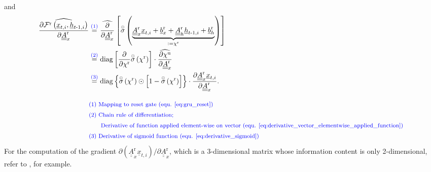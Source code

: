 and
\begin{align} \label{eq:gru_grad_intra_reset_2_Arx} 
    \widehat{
        \frac{\partial \mathcal{F}^\text{r}\left(\underline x_{t, i}, \underline h_{t\text -1, i}\right)}
            {\partial \underline{\underline{A}}^\text{r}_x} 
    }
    &\overset{\textcolor{blue}{(1)}}{=}
    \widehat{
        \frac{\partial}{\partial \underline{\underline{A}}^\text{r}_x} 
    }
    \left[
        \overset{\scriptscriptstyle \odot}{\sigma} \left(
            \underbrace{
            \underline{\underline A}^\text{r}_{x}
            \underline x_{t,i}
            +
            \underline b^\text{r}_{x}
            +
            \underline{\underline A}^\text{r}_{h}
            \underline h_{t\text -1,i}
            +
            \underline b^\text{r}_{h}}_{:=\chi^\text{r}}
        \right)
    \right]
    \nonumber \\ & \overset{\textcolor{blue}{(2)}}{=}
    \mathrm{diag} \left[
        \frac{\partial}{\partial \chi^\text{r}}
        \overset{\scriptscriptstyle \odot}{\sigma} \left(\chi^\text{r}\right)
    \right]
    \cdot
    \widehat{
        \frac{\partial \chi^\text{u}{}}
            {\partial \underline{\underline{A}}^\text{r}_x} 
    }
    \nonumber \\ & \overset{\textcolor{blue}{(3)}}{=}
    \mathrm{diag} \left\{
        \overset{\scriptscriptstyle \odot}{\sigma} \left(\chi^\text{r}\right)
        \odot
        \left[
            1 -  \overset{\scriptscriptstyle \odot}{\sigma} \left(\chi^\text{r}\right)
        \right]
    \right\}
    \cdot
    \frac{\partial \underline{\underline A}^\text{r}_{x}\underline x_{t,i}}
        {\partial \underline{\underline{A}}^\text{r}_x} 
        .
    \\[2ex]
        &\textcolor{blue}{\text{\footnotesize (1) 
            Mapping to reset gate (equ. \ref{eq:gru_reset})}} \nonumber \\
        &\textcolor{blue}{\text{\footnotesize (2) 
            Chain rule of differentiation;
        }} \nonumber \\
        &\textcolor{blue}{\text{\footnotesize \qquad
            Derivative of function applied element-wise on vector
            (equ. \ref{eq:derivative_vector_elementwise_applied_function})
        }} \nonumber \\
        &\textcolor{blue}{\text{\footnotesize (3) 
            Derivative of sigmoid function (equ. \ref{eq:derivative_sigmoid})
        }} \nonumber
\end{align}
For the computation of the gradient
$\partial \left(\underline{\underline A}^\text{r}_{x}\underline x_{t,i}\right)
        /\partial \underline{\underline{A}}^\text{r}_x
$,
which is a 3-dimensional matrix
whose information content is only 2-dimensional,
refer to \cite{LearnedMiller}, for example.



